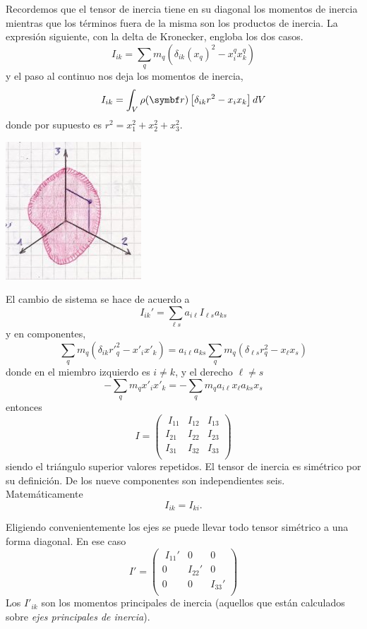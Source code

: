 \documentclass[10pt,oneside]{CBFT_book}
\begin{document}
Recordemos que el tensor de inercia tiene en su diagonal los momentos de inercia
mientras que los términos fuera de la misma son los productos de inercia.
La expresión siguiente, con la delta de Kronecker, engloba los dos casos.
\[
	I_{ik} = \sum_q m_q \left( \delta_{ik} (x_q)^2 - x_i^q x_k^q \right)
\]
y el paso al continuo nos deja los momentos de inercia,
\[
	I_{ik} = \int_V \rho(\vb{r}) \left[ \delta_{ik}r^2 - x_i x_k \right] dV
\]
donde por supuesto es $r^2 = x_1^2 + x_2^2 + x_3^2$.

\includegraphics[scale=0.4]{images/fig_mc_rigid_body_inercia1.jpg}

El cambio de sistema se hace de acuerdo a
\[
	I_{ik}' = \sum_{\ell s} a_{i\ell} I_{\ell s} a_{ks}
\]
y en componentes,
\[
	\sum_q m_q ( \delta_{ik} {r'}^2_q - x'_i x'_k ) =  a_{i\ell} a_{ks} \sum_q m_q
	( \delta_{\ell s} r^2_q - x_\ell x_s )
\]
donde en el miembro izquierdo es $i \neq k$, y el derecho $\ell \neq s$
\[
	- \sum_q m_q x'_i x'_k =  - \sum_q m_q a_{i\ell} x_\ell a_{ks}  x_s 
\]
entonces 
\[
	I =
	\begin{pmatrix} \;
		I_{11} & I_{12} & I_{13} \\
		I_{21} & I_{22} & I_{23} \\ 
		I_{31} & I_{32} & I_{33} \\
	\end{pmatrix}
\]
siendo el triángulo superior valores repetidos. El tensor de inercia es simétrico por su 
definición. De los nueve componentes son independientes seis. Matemáticamente
\[
	I_{ik} = I_{ki}.
\]

Eligiendo convenientemente los ejes se puede llevar todo tensor simétrico a una forma
diagonal. En ese caso
\[
	I' =
	\begin{pmatrix} \;
		I_{11}' & 0 & 0 \\
		0 & I_{22}' & 0 \\ 
		0 & 0 & I_{33}' \\
	\end{pmatrix}
\]
Los $I'_{ik}$ son los momentos principales de inercia (aquellos que están calculados sobre
{\it ejes principales de inercia}).
\end{document}
